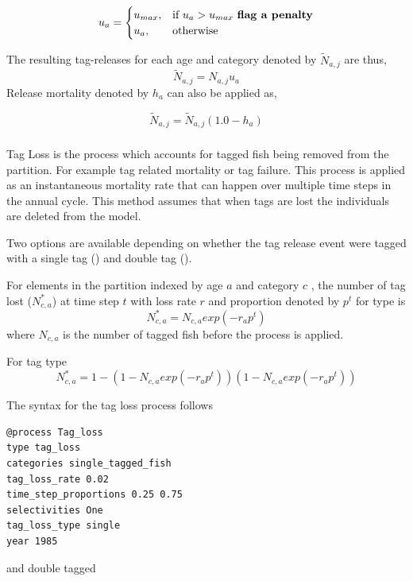 $$
u_{a} =
\begin{cases}
u_{max},& \text{if } u_{a} > u_{max} \text{ \textbf{flag a penalty}}\\
u_{a},  & \text{otherwise}
\end{cases}
$$

The resulting tag-releases for each age and category denoted by \(\widetilde{N}_{a,j}\) are thus,
$$
\widetilde{N}_{a,j} = N_{a,j} u_{a}
$$
Release mortality denoted by \(h_a\) can also be applied as,

$$\widetilde{N}_{a,j} = \widetilde{N}_{a,j}\left(1.0 - h_a\right)$$


\subsubsection{}\label{sec:Process-TagLoss} 
Tag Loss is the process which accounts for tagged fish being removed from the partition. For example tag related mortality or tag failure. This process is applied as an instantaneous mortality rate that can happen over multiple time steps in the annual cycle. This method assumes that when tags are lost the individuals are deleted from the model.


Two options are available depending on whether the tag release event were tagged with a single tag () and double tag ().

For elements in the partition indexed by age \(a\) and category \(c\) , the number of tag lost (\(N^*_{c,a}\)) at time step \(t\) with loss rate \(r\) and proportion denoted by \(p^t\) for type  is
\begin{equation}
	N^*_{c,a} = N_{c,a} exp\left( - r_a p^t\right)
\end{equation}
%
where \(N_{c,a}\) is the number of tagged fish before the process is applied.

For tag type 
\begin{equation}
N^*_{c,a} = 1 - \left(1 - N_{c,a} exp\left( - r_a p^t\right)\right)\left(1 - N_{c,a} exp\left( - r_a p^t\right)\right)
\end{equation}
%


The syntax for the tag loss process follows
{\small{\begin{verbatim}
@process Tag_loss
type tag_loss
categories single_tagged_fish
tag_loss_rate 0.02
time_step_proportions 0.25 0.75
selectivities One
tag_loss_type single
year 1985
\end{verbatim}}}
and double tagged

